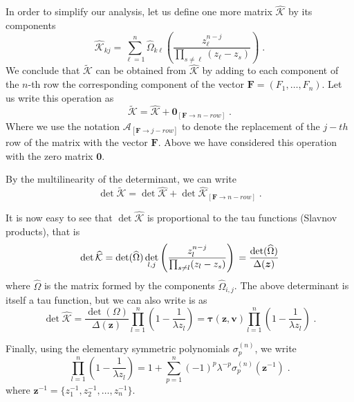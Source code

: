 \documentclass[a4paper,11pt]{amsart}
\begin{document}
In order to simplify our analysis, let us define one more matrix
\(\widehat{\mathcal{K}}\) by its components
\begin{equation}
    \widehat{\mathcal{K}}_{kj} = 
    \sum_{\ell = 1}^n  \widehat{\Omega}_{k \ell}
    \left( \frac{z_\ell^{n-j}}{\prod_{s\neq \ell} (z_\ell - z_s)} \right)
    \; .
\end{equation}
We conclude that \(\widetilde{\mathcal{K}}\) can be obtained from 
\(\widehat{\mathcal{K}}\) by adding to each component of the \(n\)-th row
the corresponding component of the vector \(\bm{F} = (F_1, \dots , F_n)\). 
Let us write this operation as 
\begin{equation}
  \widetilde{\mathcal{K}} = \widehat{\mathcal{K}} + \bm{0}_{[ \bm{F} \to n-row]}\; . 
\end{equation}
Where we use the notation \(\mathcal{A}_{[ \bm{F} \to j-row]} \) to
denote the replacement of the \(j-th\) row of the matrix with the
vector \(\bm{F}\).  Above we have considered this operation with the
zero matrix \(\bm{0}\).

By the multilinearity of the determinant, we can write
\begin{equation}
  \det \widetilde{\mathcal{K}} = 
    \det \widehat{\mathcal{K}} + 
    \det \widehat{\mathcal{K}}_{[\bm{F} \to n-row]}\; .
\end{equation}

It is now easy to see that \(\det \widehat{\mathcal{K}}\) is
proportional to the tau functions (Slavnov products), that is
\begin{equation}
    \det \widehat{\mathcal{K}}  = 
    \det(\widehat{\Omega})
    \det_{l,j}
    \left( \frac{z_l^{n-j}}{\prod_{s\neq l} (z_l - z_s)} \right)\\
    = \frac{\det(\widehat{\Omega})}{\Delta(\bm{z})}
\end{equation}
where \(\widehat{\Omega}\) is the matrix formed by the components
\(\widehat{\Omega}_{i,j}\). The above determinant is itself a tau function,
but we can also write is as
\begin{equation}
    \det \widehat{\mathcal{K}} = 
    \frac{\det(\Omega)}{\Delta(\bm{z})}
    \prod_{l=1}^n \left( 1 - \frac{1}{\lambda z_l} \right) 
    = \bm{\tau}(\bm{z}, \bm{v}) \prod_{l=1}^n \left( 1 - \frac{1}{\lambda z_l} \right) \; .
\end{equation}

Finally, using the elementary symmetric polynomials \(\sigma_p^{(n)}\), we write
\begin{equation}
  \prod_{l=1}^n \left( 1 - \frac{1}{\lambda z_l} \right) = 1 + 
  \sum_{p=1}^n (-1)^p \lambda^{-p} \sigma_p^{(n)}(\bm{z}^{-1})\; .
\end{equation}
where \( \bm{z}^{-1} = \{z_1^{-1}, z_2^{-1}, \dots , z_n^{-1}\}\). 
\end{document}
